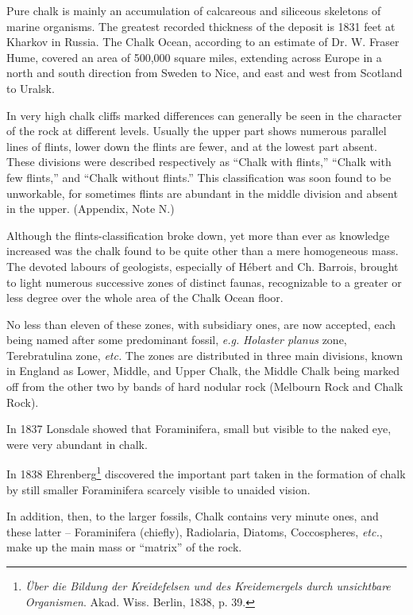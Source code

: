 \documentclass[a4paper, 12pt, oneside]{article}
\begin{document}
Pure chalk is mainly an accumulation of calcareous and siliceous skeletons of marine organisms. The greatest recorded thickness of the deposit is 1831 feet at Kharkov in Russia. The Chalk Ocean, according to an estimate of Dr. W. Fraser Hume, covered an area of 500,000 square miles, extending across Europe in a north and south direction from Sweden to Nice, and east and west from Scotland to Uralsk.

In very high chalk cliffs marked differences can generally be seen in the character of the rock at different levels. Usually the upper part shows numerous parallel lines of flints, lower down the flints are fewer, and at the lowest part absent. These divisions were described respectively as ``Chalk with flints,'' ``Chalk with few flints,'' and ``Chalk without flints.'' This classification was soon found to be unworkable, for sometimes flints are abundant in the middle division and absent in the upper. (Appendix, Note N.)

Although the flints-classification broke down, yet more than ever as knowledge increased was the chalk found to be quite other than a mere homogeneous mass. The devoted labours of geologists, especially of Hébert and Ch. Barrois, brought to light numerous successive zones of distinct faunas, recognizable to a greater or less degree over the whole area of the Chalk Ocean floor.

No less than eleven of these zones, with subsidiary ones, are now accepted, each being named after some predominant fossil, \emph{e.g.} \emph{Holaster planus} zone, Terebratulina zone, \emph{etc.} The zones are distributed in three main divisions, known in England as Lower, Middle, and Upper Chalk, the Middle Chalk being marked off from the other two by bands of hard nodular rock (Melbourn Rock and Chalk Rock).

In 1837 Lonsdale showed that Foraminifera, small but visible to the naked eye, were very abundant in chalk.

In 1838 Ehrenberg\footnote{\emph{Über die Bildung der Kreidefelsen und des Kreidemergels durch unsichtbare Organismen}. Akad. Wiss. Berlin, 1838, p. 39.} discovered the important part taken in the formation of chalk by still smaller Foraminifera scarcely visible to unaided vision.

In addition, then, to the larger fossils, Chalk contains very minute ones, and these latter -- Foraminifera (chiefly), Radiolaria, Diatoms, Coccospheres, \emph{etc.}, make up the main mass or ``matrix'' of the rock.
\end{document}
